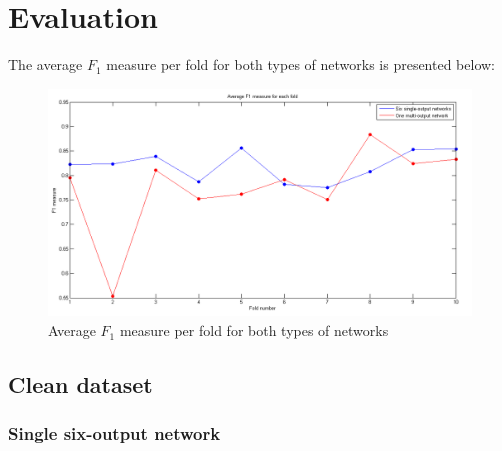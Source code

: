 \documentclass[a4paper]{article}
\begin{document}

\section{Evaluation}
The average $F_1$ measure per fold for both types of networks is presented below:
\begin{figure}[H]
\center
\includegraphics[width=0.9\columnwidth]{averageF1eachFold}
\caption{Average $F_1$ measure per fold for both types of networks}
\end{figure}

\subsection{Clean dataset}
\subsubsection{Single six-output network}
\end{document}
